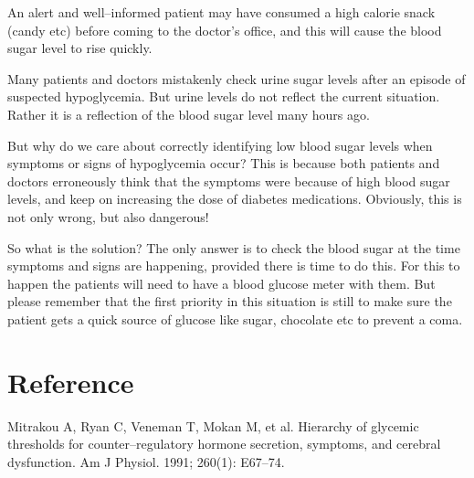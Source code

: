  \item An alert and well–informed patient may have consumed a high calorie snack (candy etc) before coming to the doctor’s office, and this will cause the blood sugar level to rise quickly.

 \item Many patients and doctors mistakenly check urine sugar levels after an episode of suspected hypoglycemia. But urine levels do not reflect the current situation. Rather it is a reflection of the blood sugar level many hours ago.

But why do we care about correctly identifying low blood sugar levels when symptoms or signs of hypoglycemia occur? This is because both patients and doctors erroneously think that the symptoms were because of high blood sugar levels, and keep on increasing the dose of diabetes medications. Obviously, this is not only wrong, but also dangerous!

So what is the solution? The only answer is to check the blood sugar at the time symptoms and signs are happening, provided there is time to do this. For this to happen the patients will need to have a blood glucose meter with them. But please remember that the first priority in this situation is still to make sure the patient gets a quick source of glucose like sugar, chocolate etc to prevent a coma.

\section*{Reference}

\begin{thebibliography}{99}
 Mitrakou A, Ryan C, Veneman T, Mokan M, et al. Hierarchy of glycemic thresholds for counter–regulatory hormone secretion, symptoms, and cerebral dysfunction. Am J Physiol. 1991; 260(1): E67–74.

 \end{thebibliography}


